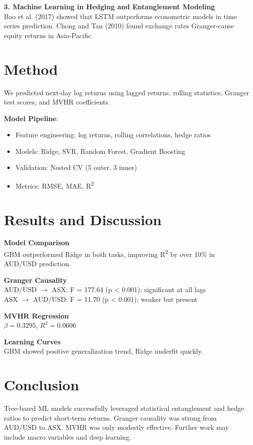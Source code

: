 \documentclass[11pt,a4paper]{article}
\begin{document}
\textbf{3. Machine Learning in Hedging and Entanglement Modeling} \\
Bao et al. (2017) showed that LSTM outperforms econometric models in time series prediction. Chong and Tan (2010) found exchange rates Granger-cause equity returns in Asia-Pacific.

\section{Method}
We predicted next-day log returns using lagged returns, rolling statistics, Granger test scores, and MVHR coefficients.

\textbf{Model Pipeline}:
\begin{itemize}
\item Feature engineering: log returns, rolling correlations, hedge ratios
\item Models: Ridge, SVR, Random Forest, Gradient Boosting
\item Validation: Nested CV (5 outer, 3 inner)
\item Metrics: RMSE, MAE, R\textsuperscript{2}
\end{itemize}

\section{Results and Discussion}
\textbf{Model Comparison} \\
GBM outperformed Ridge in both tasks, improving R\textsuperscript{2} by over 10\% in AUD/USD prediction.

\textbf{Granger Causality} \\
AUD/USD $\rightarrow$ ASX: F = 177.64 (p < 0.001); significant at all lags \\
ASX $\rightarrow$ AUD/USD: F = 11.70 (p < 0.001); weaker but present

\textbf{MVHR Regression} \\
$\beta = 0.3295$, $R^2 = 0.0606$

\textbf{Learning Curves} \\
GBM showed positive generalization trend, Ridge underfit quickly.

\section{Conclusion}
Tree-based ML models successfully leveraged statistical entanglement and hedge ratios to predict short-term returns. Granger causality was strong from AUD/USD to ASX. MVHR was only modestly effective. Further work may include macro variables and deep learning.
\end{document}
